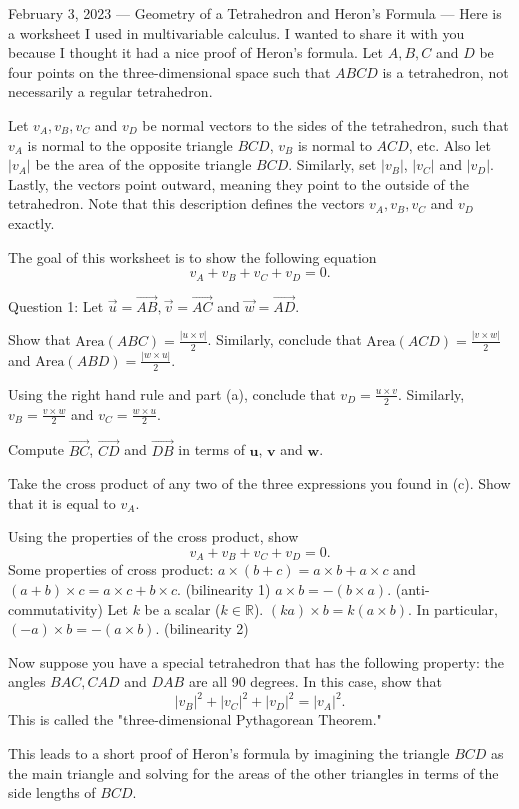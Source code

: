 February 3, 2023
---
Geometry of a Tetrahedron and Heron's Formula
---
Here is a worksheet I used in multivariable calculus. I wanted to share it with you because I thought it had a nice proof of Heron's formula.
Let $A,B,C$ and $D$ be four points on the three-dimensional space such that $ABCD$ is a tetrahedron, not necessarily a regular tetrahedron.

Let  $v_A, v_B, v_C$ and $v_D$ be normal vectors to the sides of the tetrahedron, such that $v_A$ is normal to the opposite triangle $BCD$, $v_B$ is normal to $ACD$, etc. Also let $|v_A|$ be the area of the opposite triangle $BCD$. Similarly, set $|v_B|$, $|v_C|$ and $|v_D|$. Lastly, the vectors point outward, meaning they point to the outside of the tetrahedron. Note that this description defines the vectors $v_A, v_B, v_C$ and $v_D$ exactly.

The goal of this worksheet is to show the following equation $$v_A+v_B+v_C+v_D = 0.$$ 

Question 1: Let $\overset{\rightarrow}{u} = \overset{\rightarrow}{AB}, \overset{\rightarrow}{v} = \overset{\rightarrow}{AC}$ and $\overset{\rightarrow}{w} = \overset{\rightarrow}{AD}.$ 

Show that $\textrm{Area}(ABC) = \frac{|u\times v|}{2}$. Similarly, conclude that $\textrm{Area}(ACD) = \frac{|v\times w|}{2}$ and $\textrm{Area}(ABD) = \frac{|w\times u|}{2}$. 

Using the right hand rule and part (a), conclude that $v_D = \frac{u\times v}{2}$. Similarly, $v_B = \frac{v\times w}{2}$ and $v_C = \frac{w\times u}{2}$. 

Compute $\overset{\rightarrow}{BC}$, $\overset{\rightarrow}{CD}$ and $\overset{\rightarrow}{DB}$ in terms of $\textbf{u}$, $\textbf{v}$ and $\textbf{w}$. 

Take the cross product of any two of the three expressions you found in (c). Show that it is equal to $v_A.$

Using the properties of the cross product, show $$v_A + v_B + v_C + v_D = 0.$$ Some properties of cross product:
$a\times (b+c) = a\times b + a\times c$ and $(a+b) \times c = a\times c + b\times c.$ (bilinearity 1) 
$a\times b = - (b\times a).$ (anti-commutativity)
Let $k$ be a scalar ($k\in \mathbb{R}$). $(ka) \times b = k(a\times b).$ In particular, $(-a)\times b = -(a\times b).$ (bilinearity 2)

Now suppose you have a special tetrahedron that has the following property: the angles $BAC, CAD$ and $DAB$ are all 90 degrees. In this case, show that $$|v_B|^2+|v_C|^2+|v_D|^2 = |v_A|^2.$$ This is called the "three-dimensional Pythagorean Theorem."

This leads to a short proof of Heron's formula by imagining the triangle $BCD$ as the main triangle and solving for the areas of the other triangles in terms of the side lengths of $BCD$.